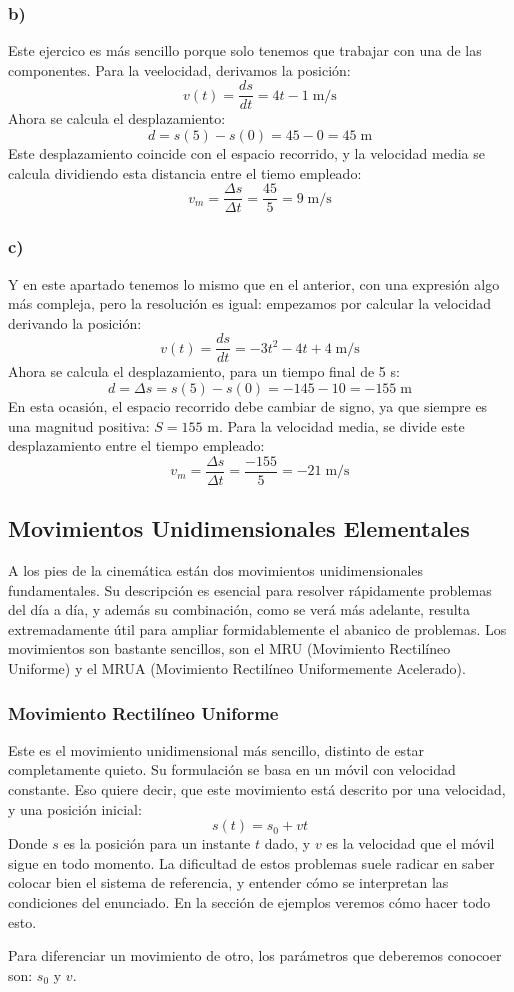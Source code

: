 \documentclass[ %
    oneside,    %
    10pt        %
]{apuntes} %
\begin{document}
\begin{examplebox}
	\subsubsection*{b)}
	Este ejercico es más sencillo porque solo tenemos que trabajar con una de las componentes. Para la veelocidad, derivamos la posición:
	\[v(t) = \frac{ds}{dt} = 4t -1 \; \text{m/s}\]
	Ahora se calcula el desplazamiento:
	\[ d = s(5) - s(0) = 45 - 0 = 45 \; \text{m}\]
	Este desplazamiento coincide con el espacio recorrido, y la velocidad media se calcula dividiendo esta distancia entre el tiemo empleado:
	\[v_m = \frac{\Delta s}{\Delta t} = \frac{45}{5} = 9 \; \text{m/s} \]
	\subsubsection*{c)}
	Y en este apartado tenemos lo mismo que en el anterior, con una expresión algo más compleja, pero la resolución es igual: empezamos por calcular la velocidad derivando la posición:
	\[v(t) = \frac{ds}{dt} = -3t^2 - 4t + 4 \; \text{m/s}\]
	Ahora se calcula el desplazamiento, para un tiempo final de 5 s:
	\[d = \Delta s = s(5) - s(0) = -145 - 10 = -155 \; \text{m}\]
	En esta ocasión, el espacio recorrido debe cambiar de signo, ya que siempre es una magnitud positiva: $S = 155$ m. Para la velocidad media, se divide este desplazamiento entre el tiempo empleado:
	\[v_m = \frac{\Delta s}{\Delta t} = \frac{-155}{5} = -21 \; \text{m/s}\]
\end{examplebox}

\subsection{Movimientos Unidimensionales Elementales}
A los pies de la cinemática están dos movimientos unidimensionales fundamentales. Su descripción es esencial para resolver rápidamente problemas del día a día, y además su combinación, como se verá más adelante, resulta extremadamente útil para ampliar formidablemente el abanico de problemas. Los movimientos son bastante sencillos, son el MRU (Movimiento Rectilíneo Uniforme) y el MRUA (Movimiento Rectilíneo Uniformemente Acelerado).

\subsubsection{Movimiento Rectilíneo Uniforme}
Este es el movimiento unidimensional más sencillo, distinto de estar completamente quieto. Su formulación se basa en un móvil con velocidad constante. Eso quiere decir, que este movimiento está descrito por una velocidad, y una posición inicial:
\[s(t) = s_0 + vt\]
Donde $s$ es la posición para un instante $t$ dado, y $v$ es la velocidad que el móvil sigue en todo momento. La dificultad de estos problemas suele radicar en saber colocar bien el sistema de referencia, y entender cómo se interpretan las condiciones del enunciado. En la sección de ejemplos veremos cómo hacer todo esto.
\par Para diferenciar un movimiento de otro, los parámetros que deberemos conocoer son: $s_0$ y $v$.
\end{document}
